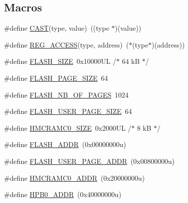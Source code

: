 \subsection*{Macros}
\begin{DoxyCompactItemize}
\item 
\#define \mbox{\hyperlink{group___s_a_m_d21_e16_b_u__definitions_ga015dfee129875688293180ddef474138}{C\+A\+ST}}(type,  value)~((type $\ast$)(value))
\item 
\#define \mbox{\hyperlink{group___s_a_m_d21_e16_b_u__definitions_gad9dd6ceb323c1d2d3caf66d30ea9a47b}{R\+E\+G\+\_\+\+A\+C\+C\+E\+SS}}(type,  address)~($\ast$(type$\ast$)(address))
\item 
\#define \mbox{\hyperlink{group___s_a_m_d21_e16_b_u__definitions_gae69620948dea1b76e0ab7843ab719db7}{F\+L\+A\+S\+H\+\_\+\+S\+I\+ZE}}~0x10000\+U\+L /$\ast$ 64 k\+B $\ast$/
\item 
\#define \mbox{\hyperlink{group___s_a_m_d21_e16_b_u__definitions_ga4cc14e2c99ae7f8e5a8e371d03c8532c}{F\+L\+A\+S\+H\+\_\+\+P\+A\+G\+E\+\_\+\+S\+I\+ZE}}~64
\item 
\#define \mbox{\hyperlink{group___s_a_m_d21_e16_b_u__definitions_ga264f8ab3607e09ec028c32cb7538fd91}{F\+L\+A\+S\+H\+\_\+\+N\+B\+\_\+\+O\+F\+\_\+\+P\+A\+G\+ES}}~1024
\item 
\#define \mbox{\hyperlink{group___s_a_m_d21_e16_b_u__definitions_ga595d6fe8572383d794338e55614a5a7f}{F\+L\+A\+S\+H\+\_\+\+U\+S\+E\+R\+\_\+\+P\+A\+G\+E\+\_\+\+S\+I\+ZE}}~64
\item 
\#define \mbox{\hyperlink{group___s_a_m_d21_e16_b_u__definitions_gaaf0b3acc28d2637a807c6c6c033a63a6}{H\+M\+C\+R\+A\+M\+C0\+\_\+\+S\+I\+ZE}}~0x2000\+U\+L /$\ast$ 8 k\+B $\ast$/
\item 
\#define \mbox{\hyperlink{group___s_a_m_d21_e16_b_u__definitions_ga485a21e55bcc66416a04d2fec83513fa}{F\+L\+A\+S\+H\+\_\+\+A\+D\+DR}}~(0x00000000u)
\item 
\#define \mbox{\hyperlink{group___s_a_m_d21_e16_b_u__definitions_ga263dc504b29b21d616514ac65000957e}{F\+L\+A\+S\+H\+\_\+\+U\+S\+E\+R\+\_\+\+P\+A\+G\+E\+\_\+\+A\+D\+DR}}~(0x00800000u)
\item 
\#define \mbox{\hyperlink{group___s_a_m_d21_e16_b_u__definitions_gab60016bed594251a4955f546002d126f}{H\+M\+C\+R\+A\+M\+C0\+\_\+\+A\+D\+DR}}~(0x20000000u)
\item 
\#define \mbox{\hyperlink{group___s_a_m_d21_e16_b_u__definitions_gaa3dc0741f009f571f4a45086601718f6}{H\+P\+B0\+\_\+\+A\+D\+DR}}~(0x40000000u)
\item 

\end{DoxyCompactItemize}
